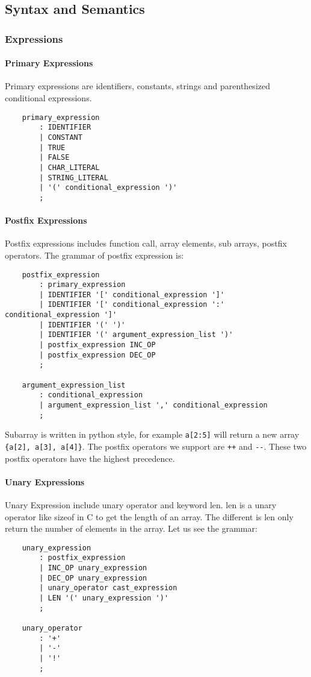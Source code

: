 \subsection{Syntax and Semantics}

\subsubsection{Expressions}

\paragraph{Primary Expressions}
Primary expressions are identifiers, constants, strings and parenthesized conditional expressions.

\begin{verbatim}
    primary_expression
        : IDENTIFIER
        | CONSTANT
        | TRUE
        | FALSE
        | CHAR_LITERAL
        | STRING_LITERAL
        | '(' conditional_expression ')'
        ;
\end{verbatim}

\paragraph{Postfix Expressions}
Postfix expressions includes function call, array elements, sub arrays, postfix operators. The
grammar of postfix expression is:

\begin{verbatim}
    postfix_expression
        : primary_expression
        | IDENTIFIER '[' conditional_expression ']'
        | IDENTIFIER '[' conditional_expression ':' conditional_expression ']'
        | IDENTIFIER '(' ')'
        | IDENTIFIER '(' argument_expression_list ')'
        | postfix_expression INC_OP
        | postfix_expression DEC_OP
        ;

    argument_expression_list
        : conditional_expression
        | argument_expression_list ',' conditional_expression
        ;
\end{verbatim}

Subarray is written in python style, for example \verb"a[2:5]" will return a new array
\verb"{a[2], a[3], a[4]}".  The postfix operators we support are \verb"++" and \verb"--". These two
postfix operators have the highest precedence.

\paragraph{Unary Expressions}
Unary Expression include unary operator and keyword len. len is a unary operator like sizeof in C to
get the length of an array. The different is len only return the number of elements in the array.
Let us see the grammar:
\begin{verbatim}
    unary_expression
        : postfix_expression
        | INC_OP unary_expression
        | DEC_OP unary_expression
        | unary_operator cast_expression
        | LEN '(' unary_expression ')'
        ;

    unary_operator
        : '+'
        | '-'
        | '!'
        ;
\end{verbatim}

